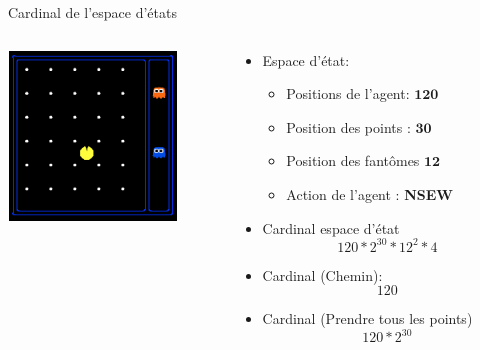 \documentclass{beamer}
\begin{document}
\begin{frame}[t]{Cardinal de l'espace d'états}
  
  \begin{columns}
    \begin{column}{0.4\textwidth}
\centering      
\includegraphics[width=4.5cm,height=4.5cm]{./images/state_space_count.png}
    \end{column}
    \begin{column}{0.6\textwidth}
      \begin{itemize}
        \scriptsize
        \item Espace d'état:
          \begin{itemize}
            \item Positions de l'agent: $\mathbf{120}$
            \item Position des points : $\mathbf{30}$
            \item Position des fantômes $\mathbf{12}$
            \item Action de l'agent : \textbf{NSEW} 
          \end{itemize}
        \item Cardinal espace d'état
          \pause
          \alert{
          \begin{equation*}
            120*2^{30}*12^2*4  
       \end{equation*}}
       \pause
     \item Cardinal (Chemin): 
       \begin{equation*}
         120
       \end{equation*}
       \pause
     \item Cardinal (Prendre tous les points)
       \begin{equation*}
         120*2^{30 }
       \end{equation*}
      \end{itemize}      
    \end{column}
  \end{columns}
\end{frame}
\end{document}
